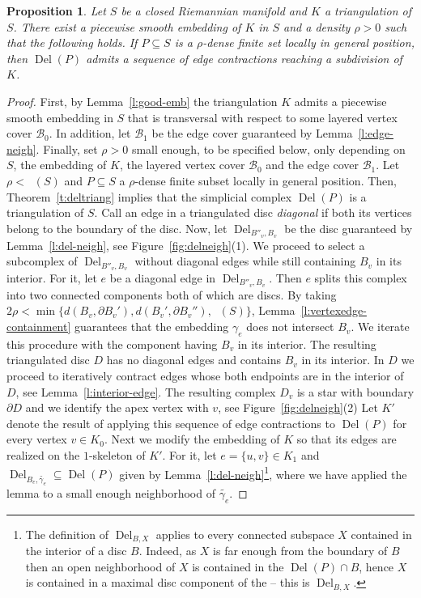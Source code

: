 \documentclass[11pt]{article}
\newtheorem{proposition}[theorem]{Proposition}
\numberwithin{claimcounter}{theorem}
\theoremstyle{remark}
\theoremstyle{definition}
\numberwithin{theorem}{section}
\DeclareMathOperator{\rscv}{r_{scv}}
\DeclareMathOperator{\rdel}{r_{Del}}
\DeclareMathOperator{\Del}{Del}
\begin{document}
%
\begin{proposition}
\label{p:refinement}
    Let $S$ be a closed Riemannian manifold and $K$ a triangulation of $S$. There exist a piecewise smooth embedding of $K$ in $S$ and a density $\rho>0$ such that the following holds. If $P\subseteq S$ is a $\rho$-dense finite set locally in general position, then $\Del(P)$ admits a sequence of edge contractions reaching a subdivision of $K$.
\end{proposition}
\begin{proof}
    First, by Lemma~\ref{l:good-emb} the triangulation $K$ admits a piecewise smooth embedding in $S$ that is transversal with respect to some layered vertex cover $\mathcal{B}_0$. In addition, let $\mathcal{B}_1$ be the edge cover guaranteed by Lemma~\ref{l:edge-neigh}.
    Finally, set $\rho >0$ small enough, to be specified below, only depending on $S$, the embedding of $K$, the layered vertex cover $\mathcal{B}_0$ and the edge cover $\mathcal{B}_1$.
%
    Let $\rho < \rdel(S)$ and $P\subseteq S$ a $\rho$-dense finite subset locally in general position. Then, Theorem~\ref{t:deltriang} implies that the simplicial complex $\Del(P)$ is a triangulation of $S$.
%
    Call an edge in a triangulated disc \emph{diagonal} if both its vertices belong to the boundary of the disc.
    Now, let $\Del_{B''_v,B_v}$ be the disc guaranteed by Lemma~\ref{l:del-neigh}, see Figure~\ref{fig:delneigh}(1). We proceed to select a subcomplex of $\Del_{B''_v,B_v}$ without diagonal edges while still containing $B_v$ in its interior. For it, let $e$ be a diagonal edge in $\Del_{B''_v,B_v}$. Then $e$ splits this complex into two connected components both of which are 
discs. 
    By taking $2\rho < \min \{d(B_v,\partial B_v'), d(B_v',\partial B_v''), \rscv(S)\}$, Lemma~\ref{l:vertexedge-containment} guarantees that the embedding $\gamma_e$ does not intersect $B_v$. We iterate this procedure with the component having $B_v$ in its interior. The resulting triangulated disc $D$ has no diagonal edges and contains $B_v$ in its interior.
    In $D$ we proceed to iteratively contract edges whose both endpoints are in the interior of $D$, see Lemma~\ref{l:interior-edge}. The resulting complex $D_v$ is a star with boundary $\partial D$ and we identify the apex vertex with $v$, see Figure~\ref{fig:delneigh}(2) Let $K'$ denote the result of applying this sequence of edge contractions to $\Del(P)$ for every vertex $v\in K_0$.
%
%
    Next we modify the embedding of $K$ 
    so that its edges are realized on the $1$-skeleton of $K'$.
    For it, let $e=\{u,v\}\in K_1$ and $\Del_{B_e,\widetilde{\gamma_e}} \subseteq \Del(P)$ given by Lemma~\ref{l:del-neigh}\footnote{The definition of $\Del_{B,X}$ applies to every connected subspace $X$ contained in the interior of a disc $B$. Indeed, as $X$ is far enough from the boundary of $B$ then an open neighborhood of $X$ is contained in the  $\Del(P)\cap B$, hence $X$ is contained in a maximal disc component of the  -- this is $\Del_{B,X}$.}, where we have applied the lemma to a small enough neighborhood of $\widetilde{\gamma_e}$. 

\end{proof}
\end{document}
